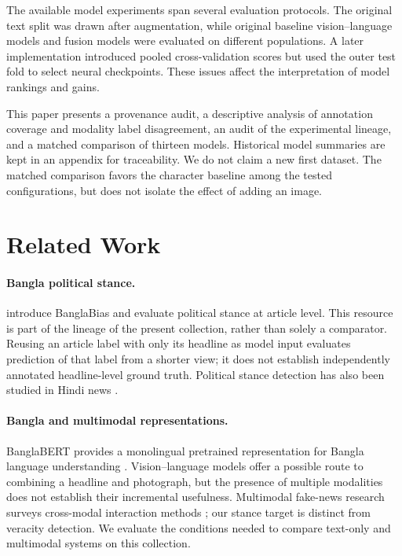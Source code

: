 \documentclass[11pt]{article}
\begin{document}
The available model experiments span several evaluation protocols. The original text split was drawn after augmentation, while original baseline vision--language models and fusion models were evaluated on different populations. A later implementation introduced pooled cross-validation scores but used the outer test fold to select neural checkpoints. These issues affect the interpretation of model rankings and gains.

This paper presents a provenance audit, a descriptive analysis of annotation coverage and modality label disagreement, an audit of the experimental lineage, and a matched comparison of thirteen models. Historical model summaries are kept in an appendix for traceability. We do not claim a new first dataset. The matched comparison favors the character baseline among the tested configurations, but does not isolate the effect of adding an image.

\section{Related Work}
\paragraph{Bangla political stance.}
\citet{lia2025read} introduce BanglaBias and evaluate political stance at article level. This resource is part of the lineage of the present collection, rather than solely a comparator. Reusing an article label with only its headline as model input evaluates prediction of that label from a shorter view; it does not establish independently annotated headline-level ground truth. Political stance detection has also been studied in Hindi news \citep{agrawal2022hindi}.

\paragraph{Bangla and multimodal representations.}
BanglaBERT provides a monolingual pretrained representation for Bangla language understanding \citep{bhattacharjee2022banglabert}. Vision--language models offer a possible route to combining a headline and photograph, but the presence of multiple modalities does not establish their incremental usefulness. Multimodal fake-news research surveys cross-modal interaction methods \citep{li2025survey}; our stance target is distinct from veracity detection. We evaluate the conditions needed to compare text-only and multimodal systems on this collection.
\end{document}
